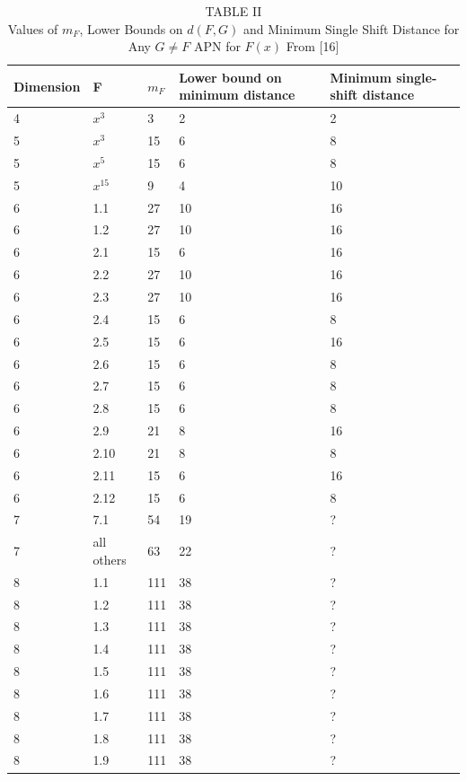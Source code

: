 \documentclass[10pt]{article}
\begin{document}
\begin{table}[h]
\begin{center}
\captionsetup{labelformat=empty}
\caption{TABLE II\\
Values of $m_{F}$, Lower Bounds on $d(F, G)$ and Minimum Single Shift Distance for Any $G \neq F$ APN for $F(x)$ From [16]}
\begin{tabular}{|l|l|l|l|l|}
\hline
Dimension & F & $m_{F}$ & Lower bound on minimum distance & Minimum single-shift distance \\
\hline
4 & $x^{3}$ & 3 & 2 & 2 \\
\hline
5 & $x^{3}$ & 15 & 6 & 8 \\
\hline
5 & $x^{5}$ & 15 & 6 & 8 \\
\hline
5 & $x^{15}$ & 9 & 4 & 10 \\
\hline
6 & 1.1 & 27 & 10 & 16 \\
\hline
6 & 1.2 & 27 & 10 & 16 \\
\hline
6 & 2.1 & 15 & 6 & 16 \\
\hline
6 & 2.2 & 27 & 10 & 16 \\
\hline
6 & 2.3 & 27 & 10 & 16 \\
\hline
6 & 2.4 & 15 & 6 & 8 \\
\hline
6 & 2.5 & 15 & 6 & 16 \\
\hline
6 & 2.6 & 15 & 6 & 8 \\
\hline
6 & 2.7 & 15 & 6 & 8 \\
\hline
6 & 2.8 & 15 & 6 & 8 \\
\hline
6 & 2.9 & 21 & 8 & 16 \\
\hline
6 & 2.10 & 21 & 8 & 8 \\
\hline
6 & 2.11 & 15 & 6 & 16 \\
\hline
6 & 2.12 & 15 & 6 & 8 \\
\hline
7 & 7.1 & 54 & 19 & ? \\
\hline
7 & all others & 63 & 22 & ? \\
\hline
8 & 1.1 & 111 & 38 & ? \\
\hline
8 & 1.2 & 111 & 38 & ? \\
\hline
8 & 1.3 & 111 & 38 & ? \\
\hline
8 & 1.4 & 111 & 38 & ? \\
\hline
8 & 1.5 & 111 & 38 & ? \\
\hline
8 & 1.6 & 111 & 38 & ? \\
\hline
8 & 1.7 & 111 & 38 & ? \\
\hline
8 & 1.8 & 111 & 38 & ? \\
\hline
8 & 1.9 & 111 & 38 & ? \\

\end{tabular}
\end{center}
\end{table}
\end{document}

